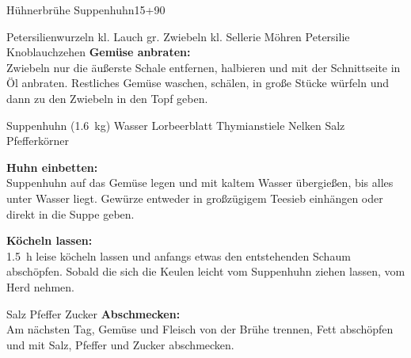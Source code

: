 \begin{MyRecipe}{Hühnerbrühe}{ Suppenhuhn}{\SI{15}{\minuteprime}+\SI{90}{\minuteprime}}

\ingredient[\Calc{2}{\x}]{} {Petersilienwurzeln}
\ingredient[\Calc{1}{\x}]{} {kl. Lauch}
\ingredient[\Calc{2}{\x}]{} {gr. Zwiebeln}
\ingredient[\Calc{1}{\x}]{} {kl. Sellerie}
\ingredient[\Calc{2}{\x}]{} {Möhren}
 {Petersilie}
\ingredient[\Calc{2}{\x}]{} {Knoblauchzehen}
\textbf{Gemüse anbraten:}\\
Zwiebeln nur die äußerste Schale entfernen, halbieren und mit der Schnittseite in Öl anbraten. Restliches Gemüse waschen, schälen, in große Stücke würfeln und dann zu den Zwiebeln in den Topf geben.

\ingredient[\Calc{1}{\x}]{} {Suppenhuhn (\SI{1,6}{\kilogram})}
 {Wasser}
\ingredient[\Calc{2}{\x}]{} {Lorbeerblatt}
\ingredient[\Calc{4}{\x}]{} {Thymianstiele}
\ingredient[\Calc{1}{\x}]{} {Nelken}
 {Salz}
 {Pfefferkörner}

\textbf{Huhn einbetten:}\\
Suppenhuhn auf das Gemüse legen und mit kaltem Wasser übergießen, bis alles unter Wasser liegt. Gewürze entweder in großzügigem Teesieb einhängen oder direkt in die Suppe geben.

\textbf{Köcheln lassen:}\\
\SI{1,5}{\hour} leise köcheln lassen und anfangs etwas den entstehenden Schaum abschöpfen. Sobald die sich die Keulen leicht vom Suppenhuhn ziehen lassen, vom Herd nehmen.\par

\ingredient[]{} {Salz}
\ingredient[]{} {Pfeffer}
\ingredient[]{} {Zucker}
\textbf{Abschmecken:}\\
Am nächsten Tag, Gemüse und Fleisch von der Brühe trennen, Fett abschöpfen und mit Salz, Pfeffer und Zucker abschmecken.









\end{MyRecipe}